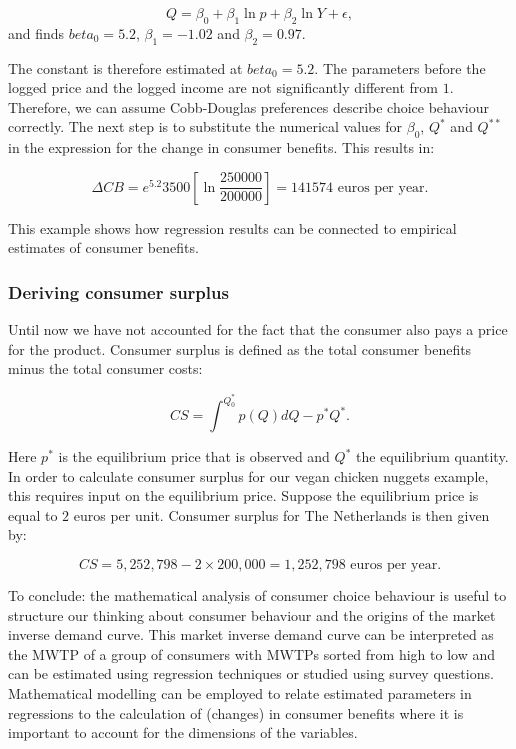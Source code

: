 \documentclass[
]{book}
\begin{document}
\begin{equation}
 Q = \beta_0 + \beta_1 \ln p + \beta_2 \ln Y + \epsilon, 
\end{equation}
and finds \(beta_0 = 5.2\), \(\beta_1 =-1.02\) and \(\beta_2 = 0.97\).

The constant is therefore estimated at \(beta_0=5.2\). The parameters before the logged price and the logged income are not significantly different from \(1\). Therefore, we can assume Cobb-Douglas preferences describe choice behaviour correctly. The next step is to substitute the numerical values for \(\beta_0\), \(Q^\ast\) and \(Q^{\ast\ast}\) in the expression for the change in consumer benefits. This results in:

\begin{equation}
\Delta CB = e^{5.2} 3500 \left[\ln \frac{250000}{200000} \right] = 141574 \text{ euros per year}.
\end{equation}

This example shows how regression results can be connected to empirical estimates of consumer benefits.

\hypertarget{deriving-consumer-surplus}{%
\subsubsection{Deriving consumer surplus}\label{deriving-consumer-surplus}}

Until now we have not accounted for the fact that the consumer also pays a price for the product. Consumer surplus is defined as the total consumer benefits minus the total consumer costs:

\begin{equation}
CS = \int^{Q^\ast_0} p(Q)dQ - p^\ast Q^\ast.
\end{equation}

Here \(p^\ast\) is the equilibrium price that is observed and \(Q^\ast\) the equilibrium quantity. In order to calculate consumer surplus for our vegan chicken nuggets example, this requires input on the equilibrium price. Suppose the equilibrium price is equal to \(2\) euros per unit. Consumer surplus for The Netherlands is then given by:

\begin{equation}
CS=5,252,798-2 \times 200,000=1,252,798 \text{ euros per year}.
\end{equation}

To conclude: the mathematical analysis of consumer choice behaviour is useful to structure our thinking about consumer behaviour and the origins of the market inverse demand curve. This market inverse demand curve can be interpreted as the MWTP of a group of consumers with MWTPs sorted from high to low and can be estimated using regression techniques or studied using survey questions. Mathematical modelling can be employed to relate estimated parameters in regressions to the calculation of (changes) in consumer benefits where it is important to account for the dimensions of the variables.
\end{document}
